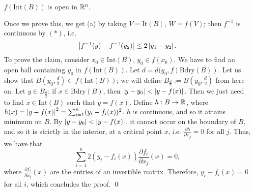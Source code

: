 \newpage
\begin{simpleclaim}
    $f(\mathrm{Int}(B))$ is open in $\mathbb R^n$.
\end{simpleclaim}
\noindent Once we prove this, we get (a) by taking $V = \mathrm{It}(B)$, $W = f(V)$; then $f^{-1}$ is continuous by $(\ast)$, i.e.
\[ \left\lvert f^{-1}(y) - f^{-1}(y_2) \right\rvert \leq 2\left\lvert y_1 - y_2 \right\rvert. \]
To prove the claim, consider $x_0 \in \mathrm{Int}(B)$, $y_0 \in f(x_0)$. We have to find an open ball containing $y_0$ in $f(\mathrm{Int}(B))$. Let $d = d(y_0, f(\mathrm{Bdry}(B))$. Let us show that $B(y_0, \frac{d}{2}) \subset f(\mathrm{Int}(B))$; we will define $B_{\frac{d}{2}} := B(y_0, \frac{d}{2})$ from here on. Let $y \in B_{\frac{d}{2}}$; if $x \in \mathrm{Bdry}(B)$, then $\left\lvert y - y_0 \right\rvert < \left\lvert y - f(x) \right\rvert$. Then we just need to find $x \in \mathrm{Int}(B)$ such that $y = f(x)$. Define $h : B \to \mathbb R$, where $h(x) = \left\lvert y - f(x) \right\rvert^2 = \sum_{i=1}^n (y_i - f_i(x))^2$. $h$ is continuous, and so it attains minimum on $B$. By $\left\lvert y - y_0 \right\rvert < \left\lvert y - f(x) \right\rvert$, it cannot occur on the boundary of $B$, and so it is strictly in the interior, at a critical point $x$, i.e. $\frac{\partial h}{\partial x_j} = 0$ for all $j$.
\medskip\newline
Thus, we have that
\[ \sum_{i=1}^n 2(y_i - f_i(x)) \frac{\partial f_i}{\partial x_j}(x) = 0, \]
where $\frac{\partial f_i}{\partial x_j}(x)$ are the entries of an invertible matrix. Therefore, $y_i - f_i(x) = 0$ for all $i$, which concludes the proof. \qed